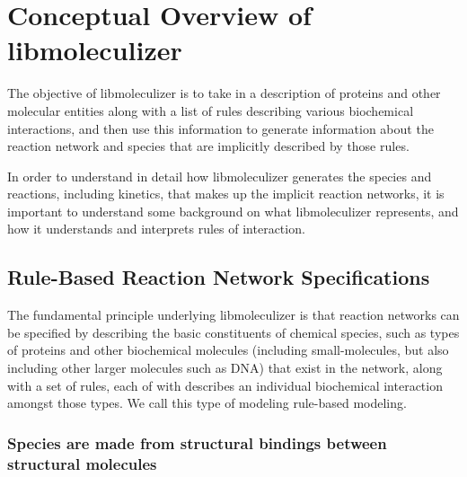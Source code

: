 \chapter{Conceptual Overview of libmoleculizer}
\label{chap:conceptualOverviewChapter}

The objective of libmoleculizer is to take in a description of
proteins and other molecular entities along with a list of rules
describing various biochemical interactions, and then use this
information to generate information about the reaction network and
species that are implicitly described by those rules.

In order to understand in detail how libmoleculizer generates the
species and reactions, including kinetics, that makes up the implicit
reaction networks, it is important to understand some background
on what libmoleculizer represents, and how it understands and interprets
rules of interaction.


\section{Rule-Based Reaction Network Specifications}
\label{concRuleBasedSpec}

The fundamental principle underlying libmoleculizer is that reaction
networks can be specified by describing the basic constituents of
chemical species, such as types of proteins and other biochemical molecules
(including small-molecules, but also including other larger molecules
such as DNA) that exist in the network, along with a set of
rules, each of with describes an individual biochemical interaction
amongst those types.  We call this type of modeling rule-based
modeling.  


\subsection{Species are made from structural bindings between
  structural molecules}

